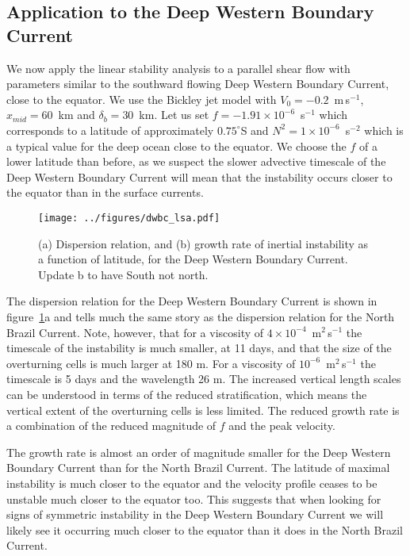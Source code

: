 \subsection{Application to the Deep Western Boundary Current}
We now apply the linear stability analysis to a parallel shear flow with parameters similar to the southward flowing Deep Western Boundary Current, close to the equator. We use the Bickley jet model with $V_0 = - 0.2$~m$\,$s$^{-1}$, $x_{mid} = 60$~km and $\delta_b = 30$~km. Let us set $f = - 1.91 \times 10^{-6}$~s$^{-1}$ which corresponds to a latitude of approximately $0.75^\circ$S and $N^2 = 1 \times 10^{-6}$~s$^{-2}$ which is a typical value for the deep ocean close to the equator. We choose the $f$ of a lower latitude than before, as we suspect the slower advective timescale of the Deep Western Boundary Current will mean that the instability occurs closer to the equator than in the surface currents.
\begin{figure}
    \centering
    \texttt{[image: ../figures/dwbc\_lsa.pdf]}
    \caption{(a) Dispersion relation, and (b) growth rate of inertial instability as a function of latitude, for the Deep Western Boundary Current. Update b to have South not north.}
    \label{fig:lsaDWBC}
\end{figure}

The dispersion relation for the Deep Western Boundary Current is shown in figure~\ref{fig:lsaDWBC}a and tells much the same story as the dispersion relation for the North Brazil Current. Note, however, that for a viscosity of $4 \times 10^{-4}$~m$^2\,$s$^{-1}$ the timescale of the instability is much smaller, at 11 days, and that the size of the overturning cells is much larger at 180 m. For a viscosity of $10^{-6}$~m$^2\,$s$^{-1}$ the timescale is 5 days and the wavelength 26 m. The increased vertical length scales can be understood in terms of the reduced stratification, which means the vertical extent of the overturning cells is less limited. The reduced growth rate is a combination of the reduced magnitude of $f$ and the peak velocity.

The growth rate is almost an order of magnitude smaller for the Deep Western Boundary Current than for the North Brazil Current. The latitude of maximal instability is much closer to the equator and the velocity profile ceases to be unstable much closer to the equator too. This suggests that when looking for signs of symmetric instability in the Deep Western Boundary Current we will likely see it occurring much closer to the equator than it does in the North Brazil Current.

